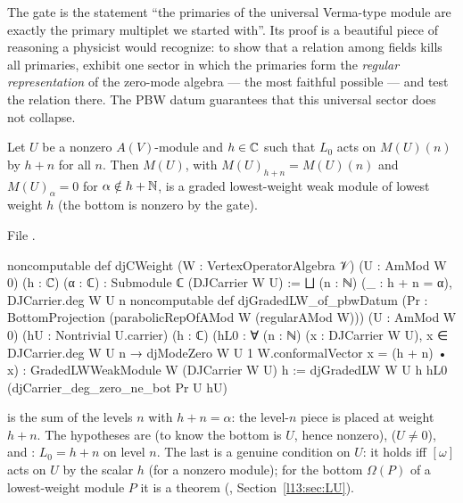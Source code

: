 \begin{physics}
The gate is the statement ``the primaries of the universal Verma-type module are exactly the primary multiplet we started
with''. Its proof is a beautiful piece of reasoning a physicist would recognize: to show that a relation among fields kills all
primaries, exhibit one sector in which the primaries form the \emph{regular representation} of the zero-mode algebra --- the
most faithful possible --- and test the relation there. The PBW datum guarantees that this universal sector does not collapse.
\end{physics}

\begin{definition}\label{l13:def:djgradedlw}
Let $U$ be a nonzero $A(V)$-module and $h\in{\mathbb{C}}$ such that $L_0$ acts on $M(U)(n)$ by $h+n$ for all $n$. Then $M(U)$, with
$M(U)_{h+n} = M(U)(n)$ and $M(U)_\alpha = 0$ for $\alpha\notin h+{\mathbb{N}}$, is a graded lowest-weight weak module of lowest weight $h$
(the bottom is nonzero by the gate).
\end{definition}
\noindent File .
\begin{leancode}
noncomputable def djCWeight (W : VertexOperatorAlgebra 𝒱) (U : AmMod W 0) (h : ℂ) (α : ℂ) :
    Submodule ℂ (DJCarrier W U) :=
  ⨆ (n : ℕ) (_ : h + n = α), DJCarrier.deg W U n
noncomputable def djGradedLW_of_pbwDatum
    (Pr : BottomProjection (parabolicRepOfAMod W (regularAMod W))) (U : AmMod W 0)
    (hU : Nontrivial U.carrier) (h : ℂ)
    (hL0 : ∀ (n : ℕ) (x : DJCarrier W U), x ∈ DJCarrier.deg W U n →
      djModeZero W U 1 W.conformalVector x = (h + n) • x) :
    GradedLWWeakModule W (DJCarrier W U) h :=
  djGradedLW W U h hL0 (djCarrier_deg_zero_ne_bot Pr U hU)
\end{leancode}

\begin{dictionary}
 is the sum of the levels $n$ with $h+n = \alpha$: the level-$n$ piece is
placed at weight $h+n$. The hypotheses are  (to know the bottom is $U$, hence nonzero), 
($U\neq0$), and : $L_0 = h+n$ on level $n$. The last is a genuine condition on $U$: it holds iff $[\omega]$ acts on $U$
by the scalar $h$ (for a nonzero module); for the bottom $\Omega(P)$ of a lowest-weight module $P$ it is a theorem
(, Section~\ref{l13:sec:LU}).
\end{dictionary}

